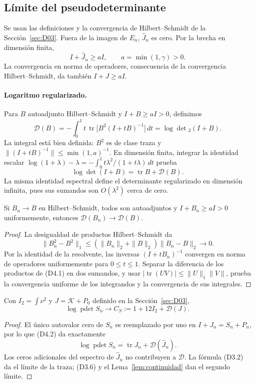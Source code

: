 \subsection{Límite del pseudodeterminante}\label{sec:D04}
Se usan las definiciones y la convergencia de Hilbert--Schmidt de la Sección~\ref{sec:D03}.
Fuera de la imagen de $E_n$, $\widehat J_n$ es cero.
Por la brecha en dimensión finita,
\[
 I+\widehat J_n\ge aI,\qquad a=\min(1,\gamma)>0.
\]
La convergencia en norma de operadores, consecuencia de la
convergencia Hilbert--Schmidt, da también $I+J\ge aI$.

\paragraph{Logaritmo regularizado.}
Para $B$ autoadjunto Hilbert--Schmidt y $I+B\ge aI>0$, definimos
\[
 \mathcal D(B)=-\int_0^1 t\,
       \operatorname{tr}\bigl[B^2(I+tB)^{-1}\bigr]\,dt
             =\log\det{}_2(I+B).                    \tag{D4.1}
\]
La integral está bien definida: $B^2$ es de clase traza y
$\|(I+tB)^{-1}\|\le\min(1,a)^{-1}$.
En dimensión finita, integrar la identidad escalar
$\log(1+\lambda)-\lambda
=-\int_0^1 t\lambda^2/(1+t\lambda)\,dt$ prueba
\[
 \log\det(I+B)=\operatorname{tr}B+\mathcal D(B).       \tag{D4.2}
\]
La misma identidad espectral define el determinante regularizado
en dimensión infinita, pues sus sumandos son $O(\lambda^2)$ cerca de cero.

\begin{lema}\label{lem:continuidad}
Si $B_n\to B$ en Hilbert--Schmidt, todos son autoadjuntos y
$I+B_n\ge aI>0$ uniformemente, entonces
$\mathcal D(B_n)\to\mathcal D(B)$.
\end{lema}
\begin{proof}
La desigualdad de productos Hilbert--Schmidt da
\[
 \|B_n^2-B^2\|_1\le
       (\|B_n\|_2+\|B\|_2)\|B_n-B\|_2\longrightarrow0.
\]
Por la identidad de la resolvente, las inversas $(I+tB_n)^{-1}$
convergen en norma de operadores uniformemente para $0\le t\le1$.
Separar la diferencia de los productos de (D4.1) en dos sumandos,
y usar $|\operatorname{tr}(UV)|\le\|U\|_1\|V\|$,
prueba la convergencia uniforme de los integrandos y la convergencia de sus integrales.
\end{proof}

\begin{teorema}\label{thm:pdet}
Con $I_2=\int\nu^2$ y $J=\mathcal K+P_0$ definido en la Sección~\ref{sec:D03},
\[
 \log\operatorname{pdet}S_n
 \longrightarrow C_S:=1+12I_2+\mathcal D(J).           \tag{D4.3}
\]
\end{teorema}
\begin{proof}
El único autovalor cero de $S_n$ es reemplazado por uno en
$I+J_n=S_n+P_n$, por lo que (D4.2) da exactamente
\[
 \log\operatorname{pdet}S_n
       =\operatorname{tr}J_n+\mathcal D(\widehat J_n).
\]
Los ceros adicionales del espectro de $\widehat J_n$ no contribuyen a
$\mathcal D$. La fórmula (D3.2) da el límite de la traza;
(D3.6) y el Lema~\ref{lem:continuidad} dan el segundo límite.
\end{proof}

